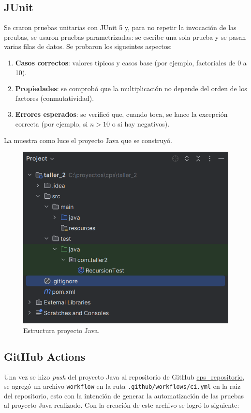 \documentclass[12pt,a4paper]{article}
\begin{document}
\subsection{JUnit}
Se craron pruebas unitarias con JUnit 5 y, para no repetir la invocación de las preubas, se usaron pruebas parametrizadas: 
se escribe una sola prueba y se pasan varias filas de datos. Se probaron los sigueintes aspectos:

\begin{enumerate}
  \item \textbf{Casos correctos}: valores típicos y casos base (por ejemplo, factoriales de 0 a 10).
  \item \textbf{Propiedades}: se comprobó que la multiplicación no depende del orden de los factores (conmutatividad).
  \item \textbf{Errores esperados}: se verificó que, cuando toca, se lance la excepción correcta (por ejemplo, si \(n>10\) o si hay negativos).
\end{enumerate}

La  muestra como luce el proyecto Java que se construyó.

\begin{figure}[h]
  \centering
  \includegraphics[width=\textwidth]{str_project.png}
  \caption{Estructura proyecto Java.}
  \label{fig:str_project}
\end{figure}

\subsection{GitHub Actions}
Una vez se hizo \textit{push} del proyecto Java al repositorio de GitHub \href{https://github.com/HaesslerOrtiz/cps}{cps\_repositorio}, 
se agregó un archivo \texttt{workflow} en la ruta \texttt{.github/workflows/ci.yml} en la raiz del repositorio, esto con la intención de 
generar la automatización de las pruebas al proyecto Java realizado. Con la creación de este archivo se logró lo siguiente:
\end{document}
